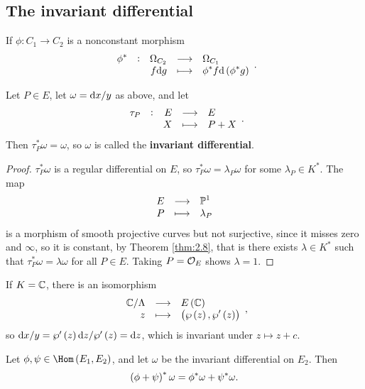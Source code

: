 \pagebreak

\subsection{The invariant differential}

\begin{definition*}
If $ \phi : C_1 \to C_2 $ is a nonconstant morphism
$$ \function[\phi^*]{\Omega_{C_2}}{\Omega_{C_1}}{f\d g}{\phi^*f\d\br{\phi^*g}}. $$
\end{definition*}

\begin{lemma}
\label{lem:6.2}
Let $ P \in E $, let $ \omega = \mathrm{d} x / y $ as above, and let
$$ \function[\tau_P]{E}{E}{X}{P + X}. $$
Then $ \tau_P^*\omega = \omega $, so $ \omega $ is called the \textbf{invariant differential}.
\end{lemma}

\begin{proof}
$ \tau_P^*\omega $ is a regular differential on $ E $, so $ \tau_P^*\omega = \lambda_P\omega $ for some $ \lambda_P \in K^* $. The map
$$ \function{E}{\PP^1}{P}{\lambda_P} $$
is a morphism of smooth projective curves but not surjective, since it misses zero and $ \infty $, so it is constant, by Theorem \ref{thm:2.8}, that is there exists $ \lambda \in K^* $ such that $ \tau_P^*\omega = \lambda\omega $ for all $ P \in E $. Taking $ P = \mathcal{O}_E $ shows $ \lambda = 1 $.
\end{proof}

\begin{remark*}
If $ K = \mathbb{C} $, there is an isomorphism
$$ \function{\CC / \Lambda}{E\br{\CC}}{z}{\br{\wp\br{z}, \wp'\br{z}}}, $$
so $ \d x / y = \wp'\br{z}\d z / \wp'\br{z} = \d z $, which is invariant under $ z \mapsto z + c $.
\end{remark*}

\begin{lemma}
\label{lem:6.3}
Let $ \phi, \psi \in \Hom\br{E_1, E_2} $, and let $ \omega $ be the invariant differential on $ E_2 $. Then
$$ \br{\phi + \psi}^*\omega = \phi^*\omega + \psi^*\omega. $$
\end{lemma}

